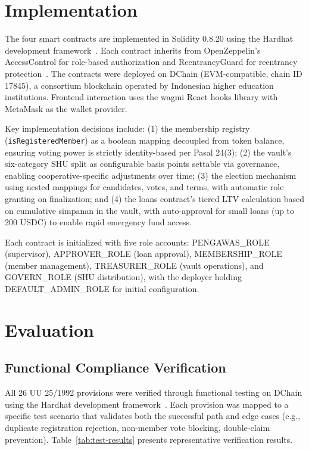 \documentclass[conference]{IEEEtran}
\begin{document}
\section{Implementation}

The four smart contracts are implemented in Solidity 0.8.20 using the Hardhat development framework~\cite{hardhat}. Each contract inherits from OpenZeppelin's AccessControl for role-based authorization and ReentrancyGuard for reentrancy protection~\cite{openzeppelin}. The contracts were deployed on DChain (EVM-compatible, chain ID 17845), a consortium blockchain operated by Indonesian higher education institutions. Frontend interaction uses the wagmi React hooks library with MetaMask as the wallet provider.

Key implementation decisions include: (1) the membership registry (\texttt{isRegisteredMember}) as a boolean mapping decoupled from token balance, ensuring voting power is strictly identity-based per Pasal 24(3); (2) the vault's six-category SHU split as configurable basis points settable via governance, enabling cooperative-specific adjustments over time; (3) the election mechanism using nested mappings for candidates, votes, and terms, with automatic role granting on finalization; and (4) the loans contract's tiered LTV calculation based on cumulative simpanan in the vault, with auto-approval for small loans (up to 200 USDC) to enable rapid emergency fund access.

Each contract is initialized with five role accounts: PENGAWAS\_ROLE (supervisor), APPROVER\_ROLE (loan approval), MEMBERSHIP\_ROLE (member management), TREASURER\_ROLE (vault operations), and GOVERN\_ROLE (SHU distribution), with the deployer holding DEFAULT\_ADMIN\_ROLE for initial configuration.

\section{Evaluation}

\subsection{Functional Compliance Verification}

All 26 UU 25/1992 provisions were verified through functional testing on DChain using the Hardhat development framework~\cite{hardhat}. Each provision was mapped to a specific test scenario that validates both the successful path and edge cases (e.g., duplicate registration rejection, non-member vote blocking, double-claim prevention). Table~\ref{tab:test-results} presents representative verification results.
\end{document}
